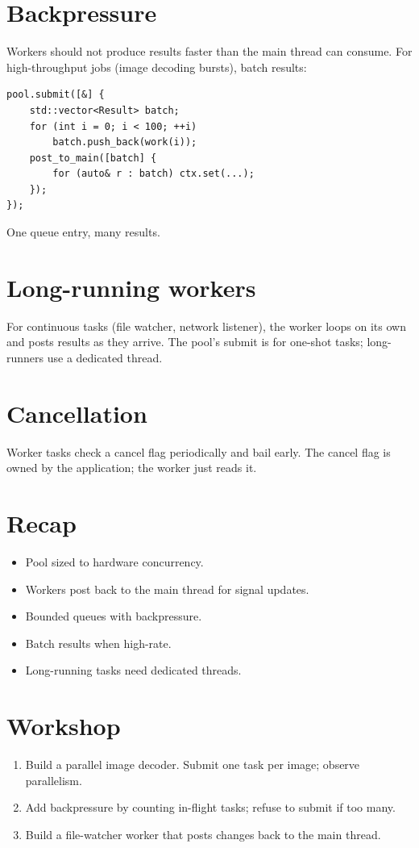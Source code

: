 \section{Backpressure}

Workers should not produce results faster than the main
thread can consume. For high-throughput jobs (image
decoding bursts), batch results:

\begin{lstlisting}
pool.submit([&] {
    std::vector<Result> batch;
    for (int i = 0; i < 100; ++i)
        batch.push_back(work(i));
    post_to_main([batch] {
        for (auto& r : batch) ctx.set(...);
    });
});
\end{lstlisting}

One queue entry, many results.

\section{Long-running workers}

For continuous tasks (file watcher, network listener), the
worker loops on its own and posts results as they arrive.
The pool's submit is for one-shot tasks; long-runners use a
dedicated thread.

\section{Cancellation}

Worker tasks check a cancel flag periodically and bail
early. The cancel flag is owned by the application; the
worker just reads it.

\section{Recap}

\begin{recap}
\begin{itemize}[leftmargin=*]
  \item Pool sized to hardware concurrency.
  \item Workers post back to the main thread for signal
    updates.
  \item Bounded queues with backpressure.
  \item Batch results when high-rate.
  \item Long-running tasks need dedicated threads.
\end{itemize}
\end{recap}

\section*{Workshop}

\begin{enumerate}[leftmargin=*]
  \item Build a parallel image decoder. Submit one task
    per image; observe parallelism.
  \item Add backpressure by counting in-flight tasks;
    refuse to submit if too many.
  \item Build a file-watcher worker that posts changes
    back to the main thread.
\end{enumerate}
